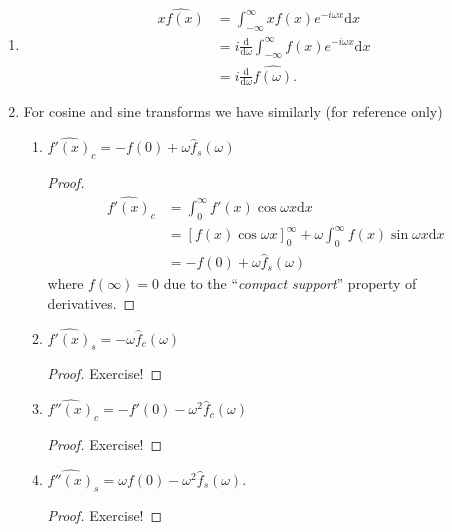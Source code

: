 \documentclass[12pt]{report}
\theoremstyle{definition}
\begin{document}
\begin{enumerate}[label = (\roman*)]
    \item 
        \begin{align*}
            \widehat{xf(x)}
            & = \int_{-\infty}^{\infty} xf(x)e^{-i\omega x}\mathrm{d}x \\
            & = i \frac{\mathrm{d}}{\mathrm{d}\omega} \int_{-\infty}^{\infty} f(x)e^{-i\omega x}\mathrm{d}x \\
            & = i\frac{\mathrm{d}}{\mathrm{d}\omega}\widehat{f(\omega)}.
        \end{align*} 

    \item For cosine and sine transforms we have similarly (for reference only)
        \begin{enumerate}[label = (\alph*)]
            \item ${\widehat{f'(x)}}_c = -f(0)+\omega\hat{f}_s(\omega)$
                \begin{proof}
                    \begin{align*}
                        {\widehat{f'(x)}}_c
                        & = \int_{0}^{\infty} f'(x) \cos{\omega x}\mathrm{d}x \\
                        & = {\left[f(x)\cos{\omega x}\right]}_0^{\infty}
                        + \omega \int_{0}^{\infty} f(x) \sin{\omega x}\mathrm{d}x \\
                        & = - f(0) +\omega\hat{f}_s(\omega)
                    \end{align*}
                    where $f(\infty)=0$ due to the ``\emph{compact support}'' property of derivatives.
                \end{proof} 

            \item ${\widehat{f'(x)}}_s = -\omega\hat{f}_c(\omega)$
                \begin{proof}
                    Exercise!
                \end{proof} 

            \item ${\widehat{f''(x)}}_c = -f'(0) - \omega^{2}\hat{f}_c(\omega)$
                \begin{proof}
                    Exercise!
                \end{proof} 

            \item ${\widehat{f''(x)}}_s = \omega f(0) - \omega^{2}\hat{f}_s(\omega)$.
                \begin{proof}
                    Exercise!
                \end{proof} 


\end{enumerate}
\end{enumerate}
\end{document}
